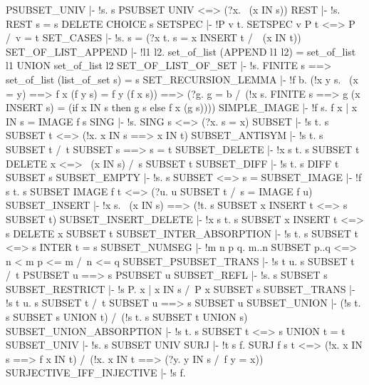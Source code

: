 \ENDTHEOREM
\THEOREM PSUBSET\_UNIV
  |- !s. s PSUBSET UNIV <=> (?x. ~(x IN s))
\ENDTHEOREM
\THEOREM REST
  |- !s. REST s = s DELETE CHOICE s
\ENDTHEOREM
\THEOREM SETSPEC
  |- !P v t. SETSPEC v P t <=> P /\ v = t
\ENDTHEOREM
\THEOREM SET\_CASES
  |- !s. s = {} \/ (?x t. s = x INSERT t /\ ~(x IN t))
\ENDTHEOREM
\THEOREM SET\_OF\_LIST\_APPEND
  |- !l1 l2. set_of_list (APPEND l1 l2) = set_of_list l1 UNION set_of_list l2
\ENDTHEOREM
\THEOREM SET\_OF\_LIST\_OF\_SET
  |- !s. FINITE s ==> set_of_list (list_of_set s) = s
\ENDTHEOREM
\THEOREM SET\_RECURSION\_LEMMA
  |- !f b.
         (!x y s. ~(x = y) ==> f x (f y s) = f y (f x s))
         ==> (?g. g {} = b /\
                  (!x s.
                       FINITE s
                       ==> g (x INSERT s) =
                           (if x IN s then g s else f x (g s))))
\ENDTHEOREM
\THEOREM SIMPLE\_IMAGE
  |- !f s. {f x | x IN s} = IMAGE f s
\ENDTHEOREM
\THEOREM SING
  |- !s. SING s <=> (?x. s = {x})
\ENDTHEOREM
\THEOREM SUBSET
  |- !s t. s SUBSET t <=> (!x. x IN s ==> x IN t)
\ENDTHEOREM
\THEOREM SUBSET\_ANTISYM
  |- !s t. s SUBSET t /\ t SUBSET s ==> s = t
\ENDTHEOREM
\THEOREM SUBSET\_DELETE
  |- !x s t. s SUBSET t DELETE x <=> ~(x IN s) /\ s SUBSET t
\ENDTHEOREM
\THEOREM SUBSET\_DIFF
  |- !s t. s DIFF t SUBSET s
\ENDTHEOREM
\THEOREM SUBSET\_EMPTY
  |- !s. s SUBSET {} <=> s = {}
\ENDTHEOREM
\THEOREM SUBSET\_IMAGE
  |- !f s t. s SUBSET IMAGE f t <=> (?u. u SUBSET t /\ s = IMAGE f u)
\ENDTHEOREM
\THEOREM SUBSET\_INSERT
  |- !x s. ~(x IN s) ==> (!t. s SUBSET x INSERT t <=> s SUBSET t)
\ENDTHEOREM
\THEOREM SUBSET\_INSERT\_DELETE
  |- !x s t. s SUBSET x INSERT t <=> s DELETE x SUBSET t
\ENDTHEOREM
\THEOREM SUBSET\_INTER\_ABSORPTION
  |- !s t. s SUBSET t <=> s INTER t = s
\ENDTHEOREM
\THEOREM SUBSET\_NUMSEG
  |- !m n p q. m..n SUBSET p..q <=> n < m \/ p <= m /\ n <= q
\ENDTHEOREM
\THEOREM SUBSET\_PSUBSET\_TRANS
  |- !s t u. s SUBSET t /\ t PSUBSET u ==> s PSUBSET u
\ENDTHEOREM
\THEOREM SUBSET\_REFL
  |- !s. s SUBSET s
\ENDTHEOREM
\THEOREM SUBSET\_RESTRICT
  |- !s P. {x | x IN s /\ P x} SUBSET s
\ENDTHEOREM
\THEOREM SUBSET\_TRANS
  |- !s t u. s SUBSET t /\ t SUBSET u ==> s SUBSET u
\ENDTHEOREM
\THEOREM SUBSET\_UNION
  |- (!s t. s SUBSET s UNION t) /\ (!s t. s SUBSET t UNION s)
\ENDTHEOREM
\THEOREM SUBSET\_UNION\_ABSORPTION
  |- !s t. s SUBSET t <=> s UNION t = t
\ENDTHEOREM
\THEOREM SUBSET\_UNIV
  |- !s. s SUBSET UNIV
\ENDTHEOREM
\THEOREM SURJ
  |- !t s f.
         SURJ f s t <=>
         (!x. x IN s ==> f x IN t) /\
         (!x. x IN t ==> (?y. y IN s /\ f y = x))
\ENDTHEOREM
\THEOREM SURJECTIVE\_IFF\_INJECTIVE
  |- !s f.
